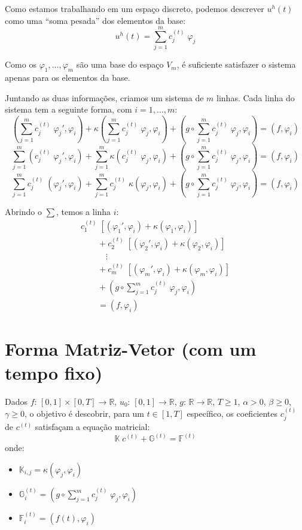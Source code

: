 \documentclass[a4paper]{article}
\newcommand{\typ}{:\,}
\newcommand{\vphi}{\varphi}
\begin{document}
Como estamos trabalhando em um espaço discreto,
podemos descrever \(u^h(t)\)
como uma ``soma pesada'' dos elementos da base:
\[
    u^h(t) = \sum_{j=1}^m{ c^{(t)}_j \; \vphi_j }
\]

Como os \(\vphi_1, \dots, \vphi_m\)
são uma base do espaço \(V_m\),
é suficiente satisfazer o sistema
apenas para os elementos da base.

Juntando as duas informações,
criamos um sistema de \(m\) linhas.
Cada linha do sistema tem a seguinte forma,
com \(i = 1, \dots, m\):
\[
    (\sum_{j=1}^m{ c^{(t)}_j \; \vphi_j' }, \vphi_i)
    + \kappa(\sum_{j=1}^m{ c^{(t)}_j \; \vphi_j }, \vphi_i)
    + (g \circ \sum_{j=1}^m{ c^{(t)}_j \; \vphi_j }, \vphi_i)
    = (f, \vphi_i)
\] \[
    \sum_{j=1}^m{ (c^{(t)}_j \; \vphi_j', \vphi_i) }
    + \sum_{j=1}^m{ \kappa(c^{(t)}_j \; \vphi_j, \vphi_i) }
    + (g \circ \sum_{j=1}^m{ c^{(t)}_j \; \vphi_j }, \vphi_i)
    = (f, \vphi_i)
\] \[
    \sum_{j=1}^m{ c^{(t)}_j \; (\vphi_j', \vphi_i) }
    + \sum_{j=1}^m{ c^{(t)}_j \; \kappa(\vphi_j, \vphi_i) }
    + (g \circ \sum_{j=1}^m{ c^{(t)}_j \; \vphi_j }, \vphi_i)
    = (f, \vphi_i)
\]

Abrindo o \(\sum\), temos a linha \(i\):
\[ \begin{array}{l}
    c^{(t)}_1 \; \left[
        (\vphi_1', \vphi_i)
        + \kappa(\vphi_1, \vphi_i)
    \right]
    \\\qquad
    + c^{(t)}_2 \; \left[
        (\vphi_2', \vphi_i)
        + \kappa(\vphi_2, \vphi_i)
    \right]
    \\\qquad
    \quad\vdots
    \\\qquad
    + c^{(t)}_m \; \left[
        (\vphi_m', \vphi_i)
        + \kappa(\vphi_m, \vphi_i)
    \right]
    \\\qquad
    + (g \circ \sum_{j=1}^m{ c^{(t)}_j \; \vphi_j }, \vphi_i)
    \\\qquad
    = (f, \vphi_i)
\end{array} \]

\section{Forma Matriz-Vetor (com um tempo fixo)}

Dados
\(f \typ [0, 1] \times [0, T] \to \mathbb{R}\),
\(u_0 \typ [0, 1] \to \mathbb{R}\),
\(g \typ \mathbb{R} \to \mathbb{R}\),
\(T \ge 1\),
\(\alpha > 0\),
\(\beta \ge 0\),
\(\gamma \ge 0\),
o objetivo é descobrir,
para um \(t \in [1, T]\) específico,
os coeficientes \(c^{(t)}_j\)
de \(c^{(t)}\)
satisfaçam a equação matricial:
\[
    \mathbb{K} \; c^{(t)} + \mathbb{G}^{(t)} = \mathbb{F}^{(t)}
\]
onde:
\begin{itemize}
\item \(
    \mathbb{K}_{i, j} = \kappa(\vphi_j, \vphi_i)
\)
\item \(
    \mathbb{G}^{(t)}_{i} = (g \circ \sum_{j=1}^m{ c^{(t)}_j \; \vphi_j }, \vphi_i)
\)
\item \(
    \mathbb{F}^{(t)}_i = (f(t), \vphi_i)
\)
\end{itemize}
\end{document}
